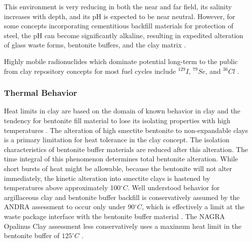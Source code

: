 This environment is very reducing in both the near and far field, its salinity 
increases with depth, and its pH is expected to be near neutral. However, for 
some concepts incorporating cementitious backfill materials for protection 
of steel, the pH can become significantly alkaline, resulting in 
expedited alteration of glass waste forms, bentonite buffers, and the clay 
matrix \cite{andra_argile:_2005}.


Highly mobile radionuclides which dominate potential long-term to the public
from clay repository concepts 
for most fuel cycles include $^{129}I$, $^{79}Se$, and $^{36}Cl$ 
\cite{swift_applying_2010}. 

\subsubsection{Thermal Behavior}
\label{sec:claythermal}


Heat limits in clay are based on the domain of known behavior in clay and the 
tendency for bentonite fill material to lose its isolating properties with high 
temperatures \cite{andra_argile:_2005, pusch_alteration_1987}. 
The alteration of high smectite bentonite to non-expandable clays is a primary 
limitation for heat tolerance in the clay concept. The isolation characteristics 
of bentonite buffer materials are reduced after this alteration. The time 
integral of this phenomenon determines total bentonite alteration. While short 
bursts of heat might be allowable, because the bentonite will not alter 
immediately, the kinetic alteration into smectite clays is hastened by 
temperatures above approximately 100$^{\circ}C$\cite{pusch_alteration_1987}. 
Well understood behavior for argillaceous clay and bentonite buffer backfill
is conservatively assumed by the \gls{ANDRA} assessment to occur only under  
90$^{\circ}C$, which is effectively a limit at the waste package interface with 
the bentonite buffer material\cite{andra_argile:_2005} .
The \gls{NAGRA} Opalinus Clay assessment less conservatively 
uses a maximum heat limit in the bentonite buffer of $125^{\circ}C$
\cite{johnson_project_2002} .


% 


